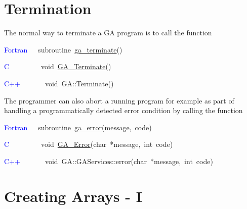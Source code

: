 \section{Termination }

The normal way to terminate a GA program is to call the function
\begin{lyxcode}
\textcolor{blue}{Fortran}~~~subroutine~\href{http://www.emsl.pnl.gov/docs/global/ga_ops.html\#ga_terminate}{ga\_{}terminate}()~

\textcolor{blue}{C~}~~~~~~~~void~\href{http://www.emsl.pnl.gov/docs/global/c_nga_ops.html\#ga_initialize}{GA\_{}Terminate}()~

\textcolor{blue}{C++}~~~~~~~void~GA::Terminate()
\end{lyxcode}
The programmer can also abort a running program for example as part
of handling a programmatically detected error condition by calling
the function
\begin{lyxcode}
\textcolor{blue}{Fortran}~~~subroutine~\href{http://www.emsl.pnl.gov/docs/global/ga_ops.html\#ga_error}{ga\_{}error}(message,~code)

\textcolor{blue}{C}~~~~~~~~~void~\href{http://www.emsl.pnl.gov/docs/global/c_nga_ops.html\#ga_error}{GA\_{}Error}(char~{*}message,~int~code)

\textcolor{blue}{C++}~~~~~~~void~GA::GAServices::error(char~{*}message,~int~code)
\end{lyxcode}

\section{Creating Arrays - I }

